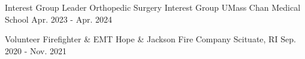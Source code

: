 
\vspace{-2mm}
\begin{cventries}

  \cventry
  {Interest Group Leader} %
  {Orthopedic Surgery Interest Group} %
  {UMass Chan Medical School} %
  {Apr. 2023 - Apr. 2024} %
  {}

  \cventry
  {Volunteer Firefighter \& EMT} %
  {Hope \& Jackson Fire Company} %
  {Scituate, RI} %
  {Sep. 2020 - Nov. 2021} %
  {}

\end{cventries}
